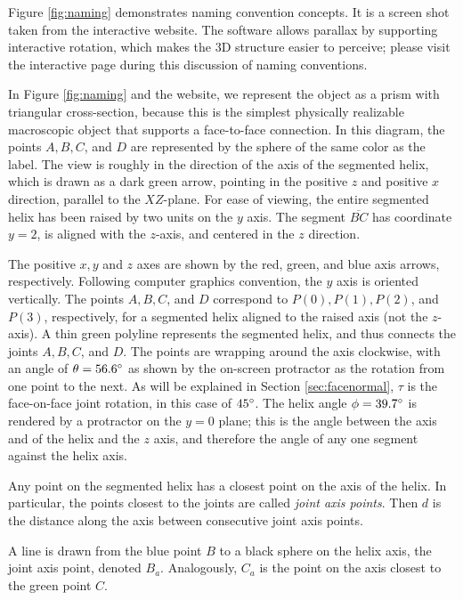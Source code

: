 \documentclass{svproc}
\begin{document}
Figure \ref{fig:naming} demonstrates naming convention concepts.
It is a screen shot taken from the interactive website\cite{segmentedhelixinteractive}.
The software allows parallax by supporting interactive rotation,
which makes the 3D structure easier to perceive;
please visit the interactive page during this discussion of naming conventions.

In Figure \ref{fig:naming} and the website, we represent the object as a prism
with triangular cross-section, because this is
the simplest physically realizable macroscopic object that supports a face-to-face connection.
In this diagram, the
points $A,B,C$, and $D$ are represented by the sphere of the same color as the label. The view is roughly in the direction of
the axis of the segmented helix, which is drawn as a dark green arrow, pointing in the positive $z$ and positive $x$ direction,
parallel to the $XZ$-plane.
For ease of viewing, the entire segmented helix has been raised by two units on the $y$ axis.
The segment $\overline{BC}$ has coordinate $y = 2$, is aligned with the $z$-axis, and centered in the $z$ direction.

The positive $x,y$ and $z$ axes are shown by the red, green, and blue axis arrows, respectively.
Following computer graphics convention, the $y$ axis is oriented vertically.
The points $A,B,C$, and $D$ correspond to $P(0), P(1), P(2)$, and $ P(3)$, respectively,
for a segmented helix aligned
to the raised axis (not the $z$-axis).
A thin green polyline represents the segmented helix, and thus connects the joints $A,B,C$, and $D$.
The points are wrapping around the axis clockwise, with an angle of $\theta = 56.6 \degree$ as
shown by the on-screen protractor as the rotation from one point to the next. As will be explained in Section \ref{sec:facenormal},
$\tau$ is the face-on-face joint rotation, in this case of $45 \degree$.
The helix angle $\phi = 39.7 \degree$ is rendered by a protractor on the $y = 0$ plane;
this is the angle between the axis
and of the helix and the $z$ axis, and therefore the angle of any one segment against the helix axis.

Any point on the segmented helix has a closest point on the axis of the helix.
In particular, the points closest to the
joints are called {\em joint axis points}.
Then $d$ is the distance along the axis between consecutive joint axis points.

A line is drawn from the blue point $B$ to a black sphere on the helix axis,
the joint axis point, denoted $B_a$. Analogously, $C_a$ is the point
on the axis closest to the green point $C$.
\end{document}
